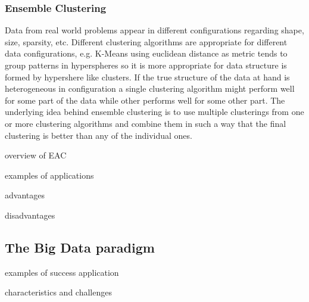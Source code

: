 \subsubsection{Ensemble Clustering}
\label{sec:eac}


Data from real world problems appear in different configurations regarding shape, size, sparsity, etc. %
Different clustering algorithms are appropriate for different data configurations, e.g. K-Means using euclidean distance as metric tends to group patterns in hyperspheres so it is more appropriate for data structure is formed by hypershere like clusters.%
If the true structure of the data at hand is heterogeneous in configuration a single clustering algorithm might perform well for some part of the data while other performs well for some other part. The underlying idea behind ensemble clustering is to use multiple clusterings from one or more clustering algorithms and combine them in such a way that the final clustering is better than any of the individual ones.

overview of EAC

examples of applications

advantages

disadvantages



\subsection{The Big Data paradigm}
\label{sec:bigdata}

examples of success application

characteristics and challenges


